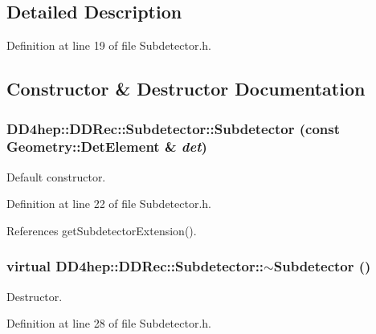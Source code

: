 \subsection{Detailed Description}


Definition at line 19 of file Subdetector.h.

\subsection{Constructor \& Destructor Documentation}
\hypertarget{class_d_d4hep_1_1_d_d_rec_1_1_subdetector_a2583b3d4d1bb2a6bcf8bb711e840bb05}{
\subsubsection[{Subdetector}]{\setlength{\rightskip}{0pt plus 5cm}DD4hep::DDRec::Subdetector::Subdetector (const {\bf Geometry::DetElement} \& {\em det})}}
\label{class_d_d4hep_1_1_d_d_rec_1_1_subdetector_a2583b3d4d1bb2a6bcf8bb711e840bb05}


Default constructor. 

Definition at line 22 of file Subdetector.h.

References getSubdetectorExtension().\hypertarget{class_d_d4hep_1_1_d_d_rec_1_1_subdetector_afae5c6780ba1bd9a99b49e9ee6618ee8}{
\subsubsection[{$\sim$Subdetector}]{\setlength{\rightskip}{0pt plus 5cm}virtual DD4hep::DDRec::Subdetector::$\sim$Subdetector ()}}
\label{class_d_d4hep_1_1_d_d_rec_1_1_subdetector_afae5c6780ba1bd9a99b49e9ee6618ee8}


Destructor. 

Definition at line 28 of file Subdetector.h.

